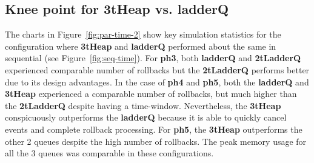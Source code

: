 \subsection{Knee point for \textbf{3tHeap} vs. \textbf{ladderQ}}

The charts in Figure~\ref{fig:par-time-2} show key simulation statistics for the configuration where \textbf{3tHeap} and \textbf{ladderQ}
performed about the same in sequential (see Figure~\ref{fig:seq-time}).  For \textbf{ph3}, both \textbf{ladderQ} and \textbf{2tLadderQ} experienced comparable number of rollbacks but the \textbf{2tLadderQ} performs better due to its design advantages. In the case of \textbf{ph4} and \textbf{ph5}, both the \textbf{ladderQ} and \textbf{3tHeap} experienced a comparable number of rollbacks, but much higher than the \textbf{2tLadderQ} despite having a time-window. Nevertheless, the \textbf{3tHeap} conspicuously outperforms the \textbf{ladderQ} because it is able to quickly cancel events and complete rollback processing. For \textbf{ph5}, the \textbf{3tHeap} outperforms the other 2 queues despite the high number of rollbacks. The peak memory usage for all the 3 queues was comparable in these configurations.

